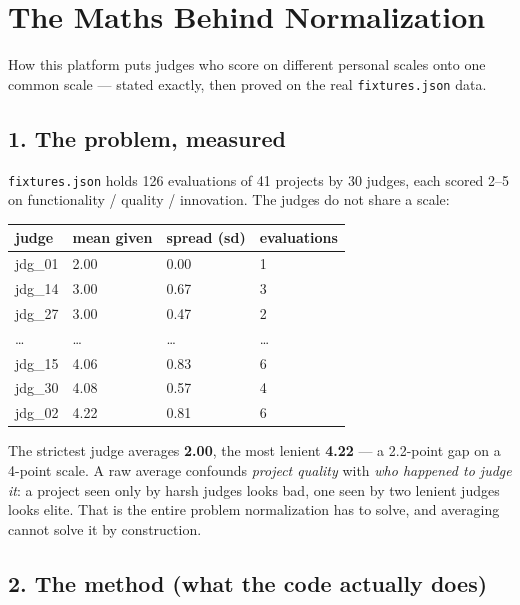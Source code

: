 \documentclass[
  11pt,
]{article}
\author{}
\date{}
\begin{document}
\hypertarget{the-maths-behind-normalization}{%
\section{The Maths Behind
Normalization}\label{the-maths-behind-normalization}}

How this platform puts judges who score on different personal scales
onto one common scale --- stated exactly, then proved on the real
\texttt{fixtures.json} data.

\hypertarget{the-problem-measured}{%
\subsection{1. The problem, measured}\label{the-problem-measured}}

\texttt{fixtures.json} holds 126 evaluations of 41 projects by 30
judges, each scored 2--5 on functionality / quality / innovation. The
judges do not share a scale:

\begin{longtable}[]{@{}llll@{}}
\toprule\noalign{}
judge & mean given & spread (sd) & evaluations \\
\midrule\noalign{}
\endhead
\bottomrule\noalign{}
\endlastfoot
jdg\_01 & 2.00 & 0.00 & 1 \\
jdg\_14 & 3.00 & 0.67 & 3 \\
jdg\_27 & 3.00 & 0.47 & 2 \\
\ldots{} & \ldots{} & \ldots{} & \ldots{} \\
jdg\_15 & 4.06 & 0.83 & 6 \\
jdg\_30 & 4.08 & 0.57 & 4 \\
jdg\_02 & 4.22 & 0.81 & 6 \\
\end{longtable}

The strictest judge averages \textbf{2.00}, the most lenient
\textbf{4.22} --- a 2.2-point gap on a 4-point scale. A raw average
confounds \emph{project quality} with \emph{who happened to judge it}: a
project seen only by harsh judges looks bad, one seen by two lenient
judges looks elite. That is the entire problem normalization has to
solve, and averaging cannot solve it by construction.

\hypertarget{the-method-what-the-code-actually-does}{%
\subsection{2. The method (what the code actually
does)}\label{the-method-what-the-code-actually-does}}
\end{document}
